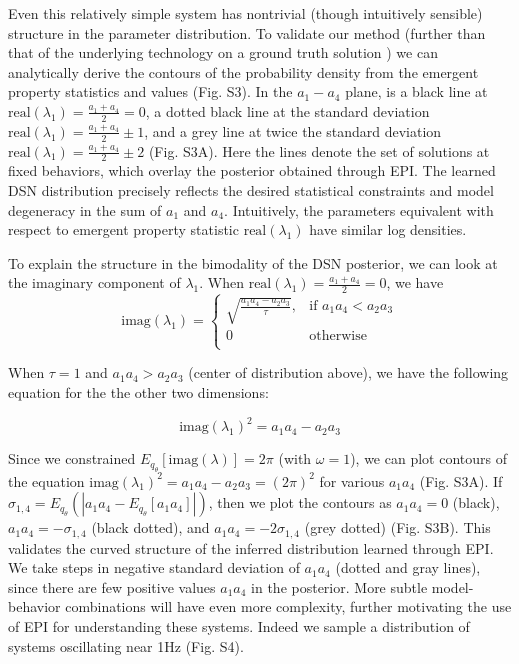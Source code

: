 \documentclass[11pt]{article}
\begin{document}
Even this relatively simple system has nontrivial (though intuitively sensible) structure in the parameter distribution.  To validate our method (further than that of the underlying technology on a ground truth solution \cite{loaiza2017maximum}) we can analytically derive the contours of the probability density from the emergent property statistics and values (Fig. S3).  In the $a_1-a_4$ plane, is a black line at $\text{real}(\lambda_1) = \frac{a_1 + a_4}{2} = 0$, a dotted black line at
the standard deviation $\text{real}(\lambda_1) = \frac{a_1 + a_4}{2} \pm 1$, and a grey line at twice the standard deviation
$\text{real}(\lambda_1) = \frac{a_1 + a_4}{2} \pm 2$ (Fig. S3A). Here the lines denote the set of solutions at fixed behaviors, which overlay the posterior obtained through EPI.  The learned DSN distribution precisely reflects the desired statistical constraints and model degeneracy in the sum of
$a_1$ and $a_4$. Intuitively, the parameters equivalent with respect to emergent property statistic $\text{real}(\lambda_1)$ have similar log densities.

To explain the structure in the bimodality of the DSN posterior, we can look at the imaginary component of $\lambda_1$.  When $\text{real}(\lambda_1) = \frac{a_1 + a_4}{2} = 0$, we have
\begin{equation}
\text{imag}(\lambda_1) = \begin{cases}
                             \sqrt{\frac{a_1 a_4 - a_2 a_3}{\tau}},  & \text{if } a_1 a_4 < a_2 a_3 \\
                             0 & \text{otherwise } \\
                         \end{cases} 
\end{equation}

When $\tau=1$ and $a_1 a_4 > a_2 a_3$ (center of distribution above), we have the following equation for the the other two dimensions:

\begin{equation}
\text{imag}(\lambda_1)^2 = a_1 a_4 - a_2 a_3
\end{equation}

Since we constrained $E_{q_\theta}\left[\text{imag}(\lambda)\right] = 2 \pi$ (with $\omega=1$), we can plot contours of the equation $\text{imag}(\lambda_1)^2 = a_1 a_4 - a_2 a_3 = (2 \pi)^2$ for various $a_1 a_4$ (Fig. S3A). If $\sigma_{1,4} = E_{q_\theta}(|a_1 a_4 - E_{q_\theta}[a_1 a_4]|)$, then we plot the contours as $a_1 a_4 = 0$ (black), $a_1 a_4 = -\sigma_{1,4}$ (black dotted), and $a_1 a_4 = -2\sigma_{1,4}$ (grey dotted) (Fig. S3B). This validates the curved structure of the inferred distribution learned through EPI.  We take steps in negative standard deviation of $a_1 a_4$ (dotted and gray lines), since there are few positive values $a_1 a_4$ in the posterior.  More subtle model-behavior combinations will have even more complexity, further motivating the use of EPI for understanding these systems.  Indeed we sample a distribution of systems oscillating near 1Hz (Fig. S4).
\end{document}
